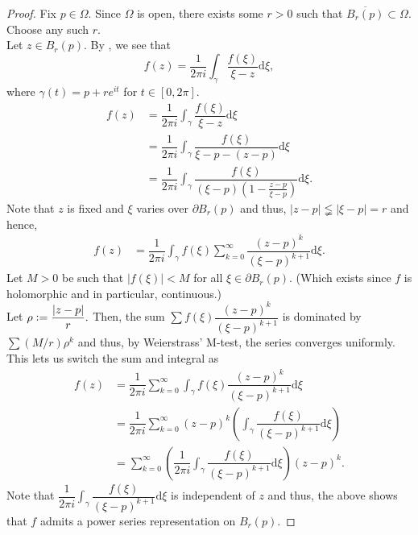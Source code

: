 \holoanalytic*\label{cor:holoanalytic2}
\begin{flushright}\hyperref[cor:holoanalytic]{\upsym}\end{flushright}
\begin{proof}
	Fix $p \in \Omega.$ Since $\Omega$ is open, there exists some $r > 0$ such that $\overline{B_r(p)} \subset \Omega.$ Choose any such $r.$\\
	Let $z \in B_r(p).$ By , we see that
	\begin{equation*} 
		f(z) = \dfrac{1}{2\pi i}\int_{\gamma}^{} \dfrac{f(\xi)}{\xi - z} \mathrm{d}\xi,
	\end{equation*}
	where $\gamma(t) = p + re^{it}$ for $t \in [0, 2\pi].$
	\begin{align*} 
		f(z) &= \dfrac{1}{2\pi i}\int_{\gamma}^{} \dfrac{f(\xi)}{\xi - z} \mathrm{d}\xi\\
		&=\dfrac{1}{2\pi i}\int_{\gamma}^{} \dfrac{f(\xi)}{\xi - p - (z - p)} \mathrm{d}\xi\\
		&= \dfrac{1}{2\pi i}\int_{\gamma}^{} \dfrac{f(\xi)}{(\xi - p)\left(1 - \frac{z - p}{\xi - p}\right)} \mathrm{d}\xi.
	\end{align*}
	Note that $z$ is fixed and $\xi$ varies over $\partial B_r(p)$ and thus, $|z - p| \lneqq |\xi - p| = r$ and hence,
	\begin{align*} 
		f(z) &= \dfrac{1}{2\pi i}\int_{\gamma}^{} f(\xi)\sum_{k=0}^{\infty}\dfrac{(z - p)^k}{(\xi - p)^{k+1}} \mathrm{d}\xi.
	\end{align*}
	Let $M > 0$ be such that $|f(\xi)| < M$ for all $\xi \in \partial B_r(p).$ (Which exists since $f$ is holomorphic and in particular, continuous.)\\
	Let $\rho \vcentcolon= \dfrac{|z - p|}{r}.$ Then, the sum $\sum f(\xi)\dfrac{(z - p)^k}{(\xi - p)^{k+1}}$ is dominated by $\sum (M/r)\rho^k$ and thus, by Weierstrass' M-test, the series converges uniformly. This lets us switch the sum and integral as
	\begin{align*} 
		f(z) &= \dfrac{1}{2\pi i}\sum_{k=0}^{\infty}\int_{\gamma}^{} f(\xi)\dfrac{(z - p)^k}{(\xi - p)^{k+1}} \mathrm{d}\xi\\
		&=\dfrac{1}{2\pi i}\sum_{k=0}^{\infty}(z - p)^k\left(\int_{\gamma}^{} \dfrac{f(\xi)}{(\xi - p)^{k+1}} \mathrm{d}\xi\right)\\
		&= \sum_{k=0}^{\infty}\left(\dfrac{1}{2\pi i}\int_{\gamma}^{} \dfrac{f(\xi)}{(\xi - p)^{k+1}} \mathrm{d}\xi\right)(z - p)^k.
	\end{align*}
	Note that $\dfrac{1}{2\pi i}\displaystyle\int_{\gamma}^{} \dfrac{f(\xi)}{(\xi - p)^{k+1}} \mathrm{d}\xi$ is independent of $z$ and thus, the above shows that $f$ admits a power series representation on $B_r(p).$
\end{proof}


